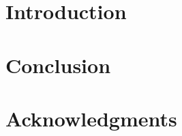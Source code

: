 \documentclass[conference]{IEEEtran}
\begin{document}
\section{Introduction}


\section{Conclusion} 


\section*{Acknowledgments}






\end{document}
